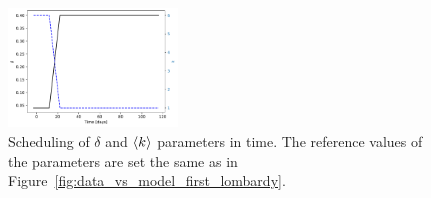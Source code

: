 \begin{figure}
\centering
  \includegraphics[width=0.4\textwidth]{imgs/Covid/Scheduling.pdf}
  \caption{Scheduling of $\delta$ and $\braket{k}$ parameters in time. The reference values of the parameters are set the same as in Figure~\ref{fig:data_vs_model_first_lombardy}.}
  \label{fig:scheduling}
\end{figure}
